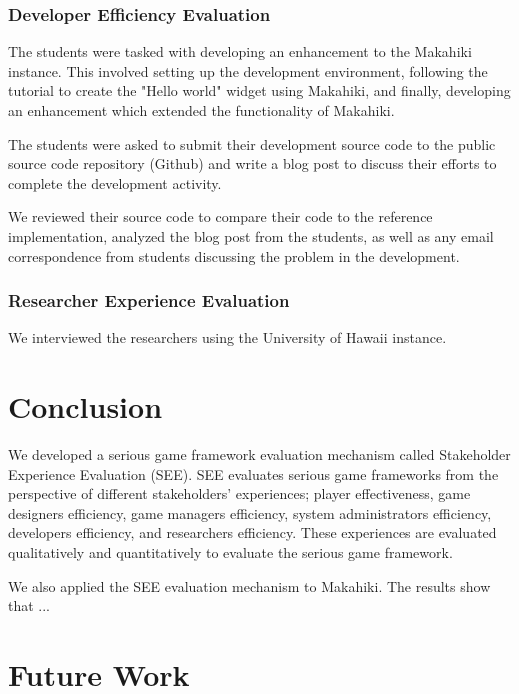 \documentclass{sigchi}
\begin{document}
\subsubsection{Developer Efficiency Evaluation}

The students were tasked with developing an enhancement to the
Makahiki instance. This involved setting up the development
environment, following the tutorial to create the "Hello world" widget
using Makahiki, and finally, developing an enhancement which extended
the functionality of Makahiki.

The students were asked to submit their development source code to the
public source code repository (Github) and write a blog post to
discuss their efforts to complete the development activity.

We reviewed their source code to compare their code to the reference
implementation, analyzed the blog post from the students, as well as
any email correspondence from students discussing the problem in the
development.

\subsubsection{Researcher Experience Evaluation}

We interviewed the researchers using the University of Hawaii
instance.

\section{Conclusion}

We developed a serious game framework evaluation mechanism called
Stakeholder Experience Evaluation (SEE). SEE evaluates serious game
frameworks from the perspective of different stakeholders'
experiences; player effectiveness, game designers efficiency, game
managers efficiency, system administrators efficiency, developers
efficiency, and researchers efficiency. These experiences are
evaluated qualitatively and quantitatively to evaluate the serious
game framework.

We also applied the SEE evaluation mechanism to Makahiki. The results
show that ...

\section{Future Work}
\end{document}
